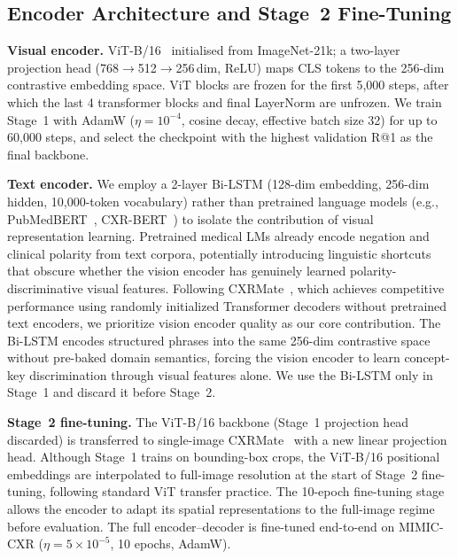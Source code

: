 \documentclass[runningheads]{llncs}
\begin{document}
\subsection{Encoder Architecture and Stage~2 Fine-Tuning}
\label{ssec:arch}

\textbf{Visual encoder.}
ViT-B/16~\cite{vit} initialised from ImageNet-21k; a two-layer
projection head (768$\to$512$\to$256\,dim, ReLU) maps CLS tokens to
the 256-dim contrastive embedding space.
ViT blocks are frozen for the first 5,000 steps, after which the last
4 transformer blocks and final LayerNorm are unfrozen.
We train Stage~1 with AdamW ($\eta{=}10^{-4}$, cosine decay,
effective batch size 32) for up to 60,000 steps, and select the
checkpoint with the highest validation R@1 as the final backbone.

\textbf{Text encoder.}
We employ a 2-layer Bi-LSTM (128-dim embedding, 256-dim hidden,
10,000-token vocabulary) rather than pretrained language models (e.g.,
PubMedBERT~\cite{pubmedbert}, CXR-BERT~\cite{cxrbert}) to isolate the
contribution of visual representation learning.
Pretrained medical LMs already encode negation and clinical polarity
from text corpora, potentially introducing linguistic shortcuts that
obscure whether the vision encoder has genuinely learned
polarity-discriminative visual features.
Following CXRMate~\cite{cxrmate}, which achieves competitive performance
using randomly initialized Transformer decoders without pretrained text
encoders, we prioritize vision encoder quality as our core contribution.
The Bi-LSTM encodes structured phrases into the same 256-dim contrastive
space without pre-baked domain semantics, forcing the vision encoder to
learn concept-key discrimination through visual features alone.
We use the Bi-LSTM only in Stage~1 and discard it before Stage~2.

\textbf{Stage~2 fine-tuning.}
The ViT-B/16 backbone (Stage~1 projection head discarded) is
transferred to single-image CXRMate~\cite{cxrmate} with a new linear
projection head.
Although Stage~1 trains on bounding-box crops, the ViT-B/16 positional
embeddings are interpolated to full-image resolution at the start of
Stage~2 fine-tuning, following standard ViT transfer practice.
The 10-epoch fine-tuning stage allows the encoder to adapt its spatial
representations to the full-image regime before evaluation.
The full encoder--decoder is fine-tuned end-to-end on MIMIC-CXR
($\eta{=}5{\times}10^{-5}$, 10 epochs, AdamW).

\end{document}
